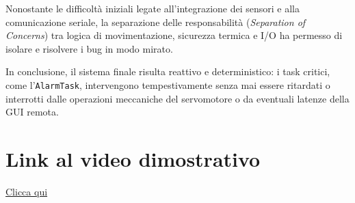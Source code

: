 \documentclass[12pt, a4paper]{article}
\begin{document}
Nonostante le difficoltà iniziali legate all'integrazione dei sensori e alla comunicazione seriale, la separazione delle responsabilità (\textit{Separation of Concerns}) tra logica di movimentazione, sicurezza termica e I/O ha permesso di isolare e risolvere i bug in modo mirato.

In conclusione, il sistema finale risulta reattivo e deterministico: i task critici, come l'\texttt{AlarmTask}, intervengono tempestivamente senza mai essere ritardati o interrotti dalle operazioni meccaniche del servomotore o da eventuali latenze della GUI remota.


\section{Link al video dimostrativo}

\href{https://liveunibo-my.sharepoint.com/:v:/g/personal/giuseppe_cattolico_studio_unibo_it/IQDR4nUTw_m4R4hXxXA34APrAXIrTUJt0A19q0IK9tlJYMQ?nav=eyJyZWZlcnJhbEluZm8iOnsicmVmZXJyYWxBcHAiOiJPbmVEcml2ZUZvckJ1c2luZXNzIiwicmVmZXJyYWxBcHBQbGF0Zm9ybSI6IldlYiIsInJlZmVycmFsTW9kZSI6InZpZXciLCJyZWZlcnJhbFZpZXciOiJNeUZpbGVzTGlua0NvcHkifX0&e=LSqfWy}{Clicca qui }
\end{document}
